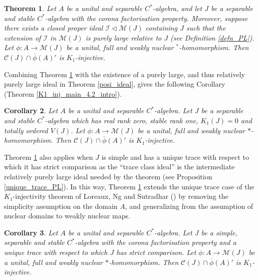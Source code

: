 \documentclass[reqno]{amsart}
\newtheorem{thm}{Theorem}[section]
\newtheorem{cor}[thm]{Corollary}
\theoremstyle{definition}
\theoremstyle{remark}
\numberwithin{equation}{section}
\theoremstyle{definition}
\newcommand{\calC}{\mathcal{C}}
\newcommand{\calM}{\mathcal{M}}
\newcommand{\calI}{\mathcal{I}}
\begin{document}
\begin{thm} \label{property_thm} 
Let $A$ be a unital and separable $C^*$-algebra, and let $J$ be a separable and stable $C^*$-algebra with the corona factorisation property. Moreover, suppose there exists a closed proper ideal $\calI \lhd\calM(J)$ containing $J$ such that the extension of $\calI$ in $\calM(J)$ is purely large relative to $J$ (see Definition \ref{defn_PL}). Let $\phi: A\rightarrow \calM(J)$ be a unital, full and weakly nuclear $^*$-homomorphism. Then $\calC(J) \cap \overline{\phi}(A)'$ is $K_{1}$-injective. 
\end{thm} 

Combining Theorem \ref{property_thm} with the existence of a
purely large, and thus relatively purely large ideal in Theorem \ref{posi_ideal}, gives the following Corollary (Theorem \ref{K1_inj_main_4.2_intro}).  

\begin{cor} \label{RR0-K1-inj}
Let $A$ be a unital and separable $C^*$-algebra. Let $J$ be a separable and stable $C^*$-algebra which has real rank zero, stable rank one, $K_{1}(J) = 0$ and totally ordered $V(J)$. Let ${\phi: A\rightarrow \calM(J)}$ be a unital, full and weakly nuclear $\ast$-homomorphism. Then $\calC(J)\cap \overline{\phi}(A)'$ is $K_{1}$-injective. 
\end{cor} 

Theorem \ref{property_thm} also applies when $J$ is simple and has a unique trace with respect to which it has strict comparison as the ``trace class ideal'' is the intermediate relatively purely large ideal needed by the theorem (see Proposition \ref{unique_trace_PL}). In this way, Theorem \ref{property_thm} extends the unique trace case of the $K_1$-injectivity theorem of Loreaux, Ng and Sutradhar (\cite[Theorem 3.28]{K1-injective}) by removing the simplicity assumption on the domain $A$, and generalizing from the assumption of nuclear domains to weakly nuclear maps. 

\begin{cor}
Let $A$ be a unital and separable $C^*$-algebra. Let $J$ be a simple, separable and stable $C^*$-algebra with the corona factorisation property and a unique trace with respect to which $J$ has strict comparison. Let $\phi: A\rightarrow \calM(J)$ be a unital, full and weakly nuclear $\ast$-homomorphism. Then $\calC(J)\cap \overline{\phi}(A)'$ is $K_{1}$-injective. 
\end{cor}  
\end{document}
